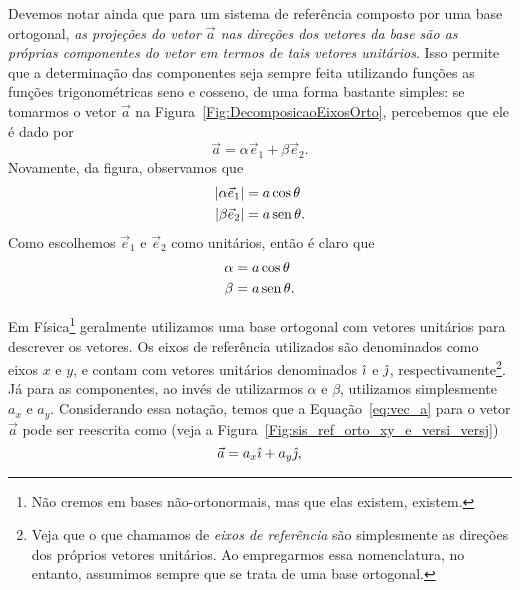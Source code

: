 Devemos notar ainda que para um sistema de referência composto por uma base ortogonal, \emph{as projeções do vetor $\vec{a}$ nas direções dos vetores da base são as próprias componentes do vetor em termos de tais vetores unitários}. Isso permite que a determinação das componentes seja sempre feita utilizando funções as funções trigonométricas seno e cosseno, de uma forma bastante simples: se tomarmos o vetor $\vec{a}$ na Figura~\ref{Fig:DecomposicaoEixosOrto}, percebemos que ele é dado por
\begin{equation}\label{eq:vec_a}
    \vec{a} = \alpha\vec{e}_1 + \beta\vec{e}_2.
\end{equation}
%
Novamente, da figura, observamos que
\begin{align}
    |\alpha\vec{e}_1| &= a\cos\theta \\
    |\beta\vec{e}_2| &= a\operatorname{sen}\theta.
\end{align}
%
Como escolhemos $\vec{e}_1$ e $\vec{e}_2$ como unitários, então é claro que
\begin{align}
    \alpha &= a\cos\theta \\
    \beta &= a\operatorname{sen}\theta.
\end{align}

Em Física\footnote{Não cremos em bases não-ortonormais, mas que elas existem, existem.} geralmente utilizamos uma base ortogonal com vetores unitários para descrever os vetores. Os eixos de referência utilizados são denominados como eixos $x$ e $y$, e contam com vetores unitários denominados $\hat{\imath}$ e $\hat{\jmath}$, respectivamente\footnote{Veja que o que chamamos de \emph{eixos de referência} são simplesmente as direções dos próprios vetores unitários. Ao empregarmos essa nomenclatura, no entanto, assumimos sempre que se trata de uma base ortogonal.}. Já para as componentes, ao invés de utilizarmos $\alpha$ e $\beta$, utilizamos simplesmente $a_x$ e $a_y$. Considerando essa notação, temos que a Equação~\eqref{eq:vec_a} para o vetor $\vec{a}$ pode ser reescrita como (veja a Figura~\ref{Fig:sis_ref_orto_xy_e_versi_versj})
\begin{equation}
    \vec{a} = a_x \hat{\imath} + a_y \hat{\jmath},
\end{equation}

